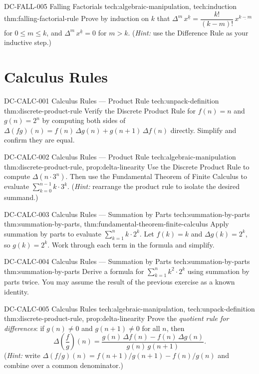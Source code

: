 \exstubgenfull
  {DC-FALL-005}
  {Falling Factorials}
  {tech:algebraic-manipulation, tech:induction}
  {thm:falling-factorial-rule}
  {Prove by induction on \(k\) that
  \(\Delta^m\, x^{\underline{k}} = \dfrac{k!}{(k-m)!}\, x^{\underline{k-m}}\)
  for \(0 \le m \le k\), and \(\Delta^m\, x^{\underline{k}} = 0\) for \(m > k\).
  (\emph{Hint:} use the Difference Rule as your inductive step.)}

\section*{Calculus Rules}

\exstubgenfull
  {DC-CALC-001}
  {Calculus Rules --- Product Rule}
  {tech:unpack-definition}
  {thm:discrete-product-rule}
  {Verify the Discrete Product Rule for \(f(n) = n\) and \(g(n) = 2^n\)
  by computing both sides of
  \(\Delta(fg)(n) = f(n)\,\Delta g(n) + g(n+1)\,\Delta f(n)\)
  directly. Simplify and confirm they are equal.}

\exstubgenfull
  {DC-CALC-002}
  {Calculus Rules --- Product Rule}
  {tech:algebraic-manipulation}
  {thm:discrete-product-rule, prop:delta-linearity}
  {Use the Discrete Product Rule to compute \(\Delta(n \cdot 3^n)\).
  Then use the Fundamental Theorem of Finite Calculus to evaluate
  \(\displaystyle\sum_{k=0}^{n-1} k \cdot 3^k\).
  (\emph{Hint:} rearrange the product rule to isolate the desired summand.)}

\exstubgenfull
  {DC-CALC-003}
  {Calculus Rules --- Summation by Parts}
  {tech:summation-by-parts}
  {thm:summation-by-parts, thm:fundamental-theorem-finite-calculus}
  {Apply summation by parts to evaluate
  \(\displaystyle\sum_{k=1}^{n} k \cdot 2^k\).
  Let \(f(k) = k\) and \(\Delta g(k) = 2^k\), so \(g(k) = 2^k\).
  Work through each term in the formula and simplify.}

\exstubgenfull
  {DC-CALC-004}
  {Calculus Rules --- Summation by Parts}
  {tech:summation-by-parts}
  {thm:summation-by-parts}
  {Derive a formula for \(\displaystyle\sum_{k=1}^{n} k^2 \cdot 2^k\)
  using summation by parts twice. You may assume the result of the
  previous exercise as a known identity.}

\exstubgenfull
  {DC-CALC-005}
  {Calculus Rules}
  {tech:algebraic-manipulation, tech:unpack-definition}
  {thm:discrete-product-rule, prop:delta-linearity}
  {Prove the \emph{quotient rule for differences}: if \(g(n) \ne 0\) and
  \(g(n+1) \ne 0\) for all \(n\), then
  \[
  \Delta\!\left(\frac{f}{g}\right)(n)
  = \frac{g(n)\,\Delta f(n) - f(n)\,\Delta g(n)}{g(n)\,g(n+1)}.
  \]
  (\emph{Hint:} write \(\Delta(f/g)(n) = f(n+1)/g(n+1) - f(n)/g(n)\)
  and combine over a common denominator.)}

